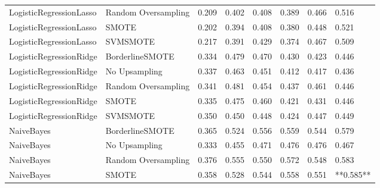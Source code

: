 \begin{tabular}{llllllll}
     LogisticRegressionLasso & Random Oversampling & 0.209 &                     0.402 &                 0.408 &                  0.389 &                                   0.466 &     0.516 \\
     LogisticRegressionLasso &               SMOTE & 0.202 &                     0.394 &                 0.408 &                  0.380 &                                   0.448 &     0.521 \\
     LogisticRegressionLasso &            SVMSMOTE & 0.217 &                     0.391 &                 0.429 &                  0.374 &                                   0.467 &     0.509 \\
     LogisticRegressionRidge &     BorderlineSMOTE & 0.334 &                     0.479 &                 0.470 &                  0.430 &                                   0.423 &     0.446 \\
     LogisticRegressionRidge &       No Upsampling & 0.337 &                     0.463 &                 0.451 &                  0.412 &                                   0.417 &     0.436 \\
     LogisticRegressionRidge & Random Oversampling & 0.341 &                     0.481 &                 0.454 &                  0.437 &                                   0.461 &     0.446 \\
     LogisticRegressionRidge &               SMOTE & 0.335 &                     0.475 &                 0.460 &                  0.421 &                                   0.431 &     0.446 \\
     LogisticRegressionRidge &            SVMSMOTE & 0.350 &                     0.450 &                 0.448 &                  0.424 &                                   0.447 &     0.449 \\
                  NaiveBayes &     BorderlineSMOTE & 0.365 &                     0.524 &                 0.556 &                  0.559 &                                   0.544 &     0.579 \\
                  NaiveBayes &       No Upsampling & 0.333 &                     0.455 &                 0.471 &                  0.476 &                                   0.476 &     0.467 \\
                  NaiveBayes & Random Oversampling & 0.376 &                     0.555 &                 0.550 &                  0.572 &                                   0.548 &     0.583 \\
                  NaiveBayes &               SMOTE & 0.358 &                     0.528 &                 0.544 &                  0.558 &                                   0.551 & **0.585** \\

\end{tabular}
